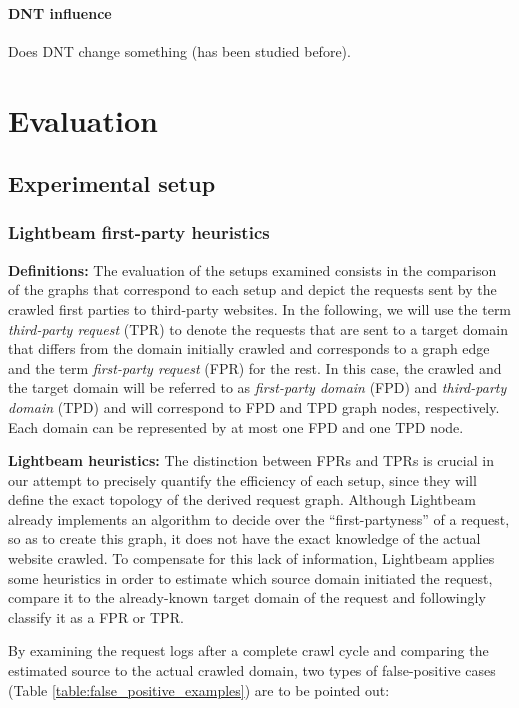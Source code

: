 \documentclass{sig-alternate}
\begin{document}
\paragraph{DNT influence}
Does DNT change something (has been studied before).

\section{Evaluation}

\subsection{Experimental setup}

\subsubsection{Lightbeam first-party heuristics}
\textbf{Definitions:} The evaluation of the setups examined consists in the comparison of the graphs that correspond to each setup and depict the requests sent by the crawled first parties to third-party websites. In the following, we will use the term \textit{third-party request} (TPR) to denote the requests that are sent to a target domain that differs from the domain initially crawled and corresponds to a graph edge and the term \textit{first-party request} (FPR) for the rest. In this case, the crawled and the target domain will be referred to as \textit{first-party domain} (FPD) and \textit{third-party domain} (TPD) and will correspond to FPD and TPD graph nodes, respectively. Each domain can be represented by at most one FPD and one TPD node.

\textbf{Lightbeam heuristics:} The distinction between FPRs and TPRs is crucial in our attempt to precisely quantify the efficiency of each setup, since they will define the exact topology of the derived request graph. Although Lightbeam already implements an algorithm to decide over the ``first-partyness'' of a request, so as to create this graph, it does not have the exact knowledge of the actual website crawled. To compensate for this lack of information, Lightbeam applies some heuristics in order to estimate which source domain initiated the request, compare it to the already-known target domain of the request and followingly classify it as a FPR or TPR.

By examining the request logs after a complete crawl cycle and comparing the estimated source to the actual crawled domain, two types of false-positive cases (Table \ref{table:false_positive_examples}) are to be pointed out:
\end{document}
